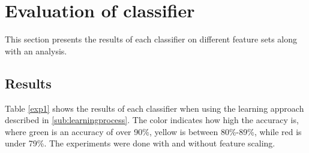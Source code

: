 \documentclass[USenglish]{ifimaster}  %
\begin{document}
 
\section{Evaluation of classifier}\label{result_exp1}
This section presents the results of each classifier on different feature sets along with an analysis.
	
\subsection{Results}
Table \ref{exp1} shows the results of each classifier when using the learning approach described in \ref{sub:learningprocess}. The color indicates how high the accuracy is, where green is an accuracy of over 90\%, yellow is between 80\%-89\%, while red is under 79\%. The experiments were done with and without feature scaling.  
\end{document}
